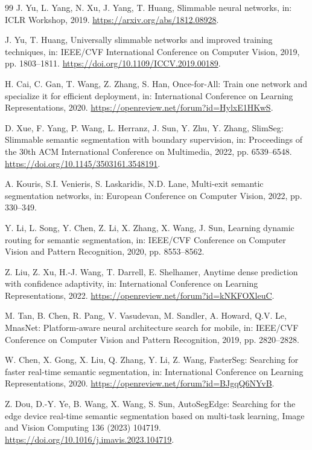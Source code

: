 \documentclass[a4paper,review,12pt]{elsarticle}
\begin{document}
\begin{thebibliography}{99}
J. Yu, L. Yang, N. Xu, J. Yang, T. Huang,
Slimmable neural networks,
in: ICLR Workshop, 2019.
\url{https://arxiv.org/abs/1812.08928}.

J. Yu, T. Huang,
Universally slimmable networks and improved training techniques,
in: IEEE/CVF International Conference on Computer Vision, 2019, pp. 1803--1811.
\url{https://doi.org/10.1109/ICCV.2019.00189}.

H. Cai, C. Gan, T. Wang, Z. Zhang, S. Han,
Once-for-All: Train one network and specialize it for efficient deployment,
in: International Conference on Learning Representations, 2020.
\url{https://openreview.net/forum?id=HylxE1HKwS}.

D. Xue, F. Yang, P. Wang, L. Herranz, J. Sun, Y. Zhu, Y. Zhang,
SlimSeg: Slimmable semantic segmentation with boundary supervision,
in: Proceedings of the 30th ACM International Conference on Multimedia, 2022, pp. 6539--6548.
\url{https://doi.org/10.1145/3503161.3548191}.

A. Kouris, S.I. Venieris, S. Laskaridis, N.D. Lane,
Multi-exit semantic segmentation networks,
in: European Conference on Computer Vision, 2022, pp. 330--349.

Y. Li, L. Song, Y. Chen, Z. Li, X. Zhang, X. Wang, J. Sun,
Learning dynamic routing for semantic segmentation,
in: IEEE/CVF Conference on Computer Vision and Pattern Recognition, 2020, pp. 8553--8562.

Z. Liu, Z. Xu, H.-J. Wang, T. Darrell, E. Shelhamer,
Anytime dense prediction with confidence adaptivity,
in: International Conference on Learning Representations, 2022.
\url{https://openreview.net/forum?id=kNKFOXleuC}.

M. Tan, B. Chen, R. Pang, V. Vasudevan, M. Sandler, A. Howard, Q.V. Le,
MnasNet: Platform-aware neural architecture search for mobile,
in: IEEE/CVF Conference on Computer Vision and Pattern Recognition, 2019, pp. 2820--2828.

W. Chen, X. Gong, X. Liu, Q. Zhang, Y. Li, Z. Wang,
FasterSeg: Searching for faster real-time semantic segmentation,
in: International Conference on Learning Representations, 2020.
\url{https://openreview.net/forum?id=BJgqQ6NYvB}.

Z. Dou, D.-Y. Ye, B. Wang, X. Wang, S. Sun,
AutoSegEdge: Searching for the edge device real-time semantic segmentation based on multi-task learning,
Image and Vision Computing 136 (2023) 104719.
\url{https://doi.org/10.1016/j.imavis.2023.104719}.


\end{thebibliography}
\end{document}
